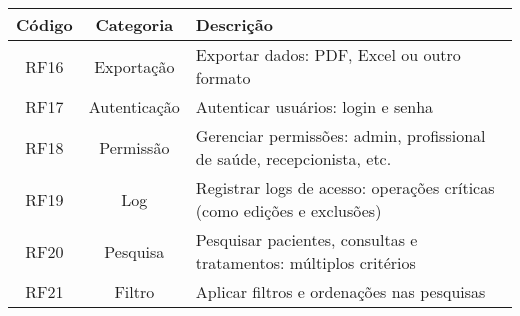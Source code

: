 \begin{quadro}[!htbp]
    \small
    \begin{tabular}{|c|c|p{10cm}|}
        \hline
        \textbf{Código} & \textbf{Categoria} & \textbf{Descrição} \\ \hline
        RF16   & Exportação   & Exportar dados: PDF, Excel ou outro formato \\ \hline
        RF17   & Autenticação & Autenticar usuários: login e senha \\ \hline
        RF18   & Permissão    & Gerenciar permissões: admin, profissional de saúde, recepcionista, etc. \\ \hline
        RF19   & Log          & Registrar logs de acesso: operações críticas (como edições e exclusões) \\ \hline
        RF20   & Pesquisa     & Pesquisar pacientes, consultas e tratamentos: múltiplos critérios \\ \hline
        RF21   & Filtro       & Aplicar filtros e ordenações nas pesquisas \\ \hline
    \end{tabular}
\end{quadro}
